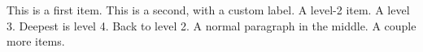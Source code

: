\documentclass[twoside,11pt]{article}
\begin{document}
\fancyhead{}
\begin{outline}
    \1 This is a first item.
    \1[!!!] This is a second, with a custom label.
    \2 A level-2 item.
    \3 A level 3.
    \4 Deepest is level 4.
    \2 Back to level 2.
    \0 A normal paragraph in the middle.
    \1 A couple more
    \2 items.
\end{outline}
\end{document}
